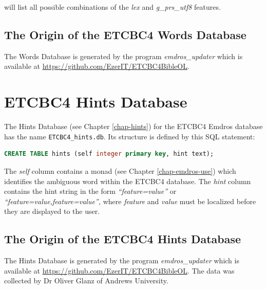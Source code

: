 \documentclass[11pt,oneside,a4paper]{memoir}
\begin{document}
\noindent
will list all possible combinations of the \emph{lex} and \emph{g\_prs\_utf8} features.

\section{The Origin of the ETCBC4 Words Database}

The Words Database is generated by the program \emph{emdros\_updater} which
is available at \url{https://github.com/EzerIT/ETCBC4BibleOL}.



\chapter{ETCBC4 Hints Database}\label{app-hintsdb}

The Hints Database (see Chapter \ref{chap-hints}) for the ETCBC4 Emdros database has the name
\texttt{ETCBC4\_hints.db}. Its structure is defined by this SQL statement:

\begin{lstlisting}[language=SQL]
CREATE TABLE hints (self integer primary key, hint text);
\end{lstlisting}

The \emph{self} column contains a monad (see Chapter \ref{chap-emdros-use}) which
identifies the ambiguous word within the ETCBC4 database. The \emph{hint} column contains the hint
string in the form \emph{``feature=value''} or \emph{``feature=value,\thinspace{}feature=value'',} where
\emph{feature} and \emph{value} must be localized before they are displayed to the user.


\section{The Origin of the ETCBC4 Hints Database}

The Hints Database is generated by the program \emph{emdros\_updater} which
is available at \url{https://github.com/EzerIT/ETCBC4BibleOL}. The data was collected by Dr Oliver
Glanz of Andrews University.
\end{document}
